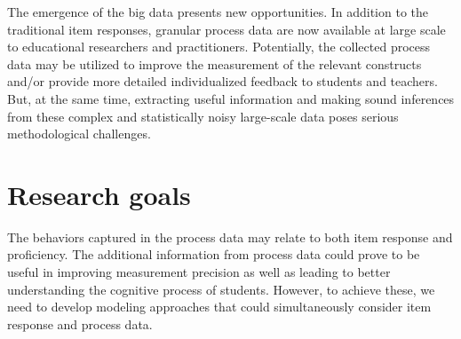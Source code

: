 \documentclass[11pt, letterpaper]{article}
\begin{document}
  The emergence of the big data presents new opportunities. In addition to the
  traditional item responses, granular process data are now available at
  large scale to educational researchers and practitioners. Potentially,
  the collected process data may be utilized to improve the measurement of
  the relevant constructs and/or provide more detailed individualized
  feedback to students and teachers. But, at the same time, extracting useful
  information and making sound inferences from these complex and statistically
  noisy large-scale data poses serious methodological challenges. 

  \section{Research goals}
  The behaviors captured in the process data may relate to both item response
  and proficiency. The additional information from process data could prove to
  be useful in improving measurement precision as well as leading to better
  understanding the cognitive process of students. However, to achieve these, we
  need to develop modeling approaches that could simultaneously consider item
  response and process data.
\end{document}
